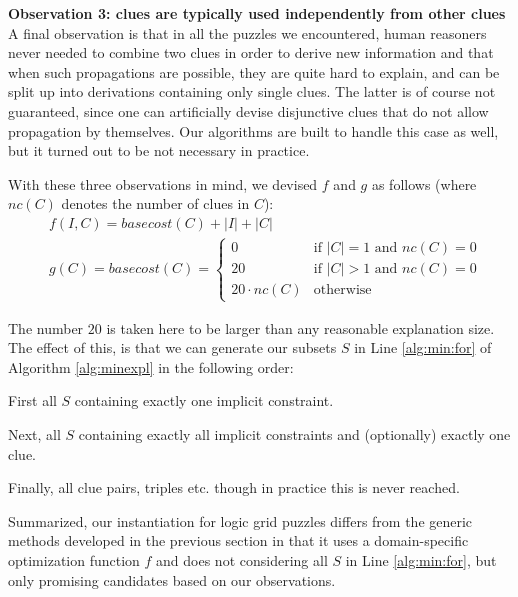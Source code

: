 \textbf{Observation 3: clues are typically used independently from other clues} 
A final observation is that in all the puzzles we encountered, human reasoners never needed to combine two clues in order to derive new information and that when such propagations are possible, they are quite hard to explain, and can be split up into derivations containing only single clues.
The latter is of course not guaranteed, since one can artificially devise disjunctive clues that do not allow propagation by themselves. 
Our algorithms are built to handle this case as well, but it turned out to be not necessary in practice. 

With these three observations in mind, we devised $f$ and $g$ as follows (where $nc(C)$ denotes the number of clues in $C$): \label{sec:cost}
\begin{align*}&f(I,C) = basecost(C) + |I| + |C|\\
&g(C) = basecost(C) = \left\{\begin{array}{ll}
                               0 & \text{if $|C|=1$ and $nc(C) = 0$}\\
                               20 & \text{if $|C|>1$ and $nc(C)=0$}\\
                               20\cdot nc(C) & \text{otherwise}
                              \end{array}\right.
                              \end{align*}
                              
The number $20$ is taken here to be larger than any reasonable explanation size. 
The effect of this,  is that we can generate our subsets $S$ in Line \ref{alg:min:for}
 of Algorithm \ref{alg:minexpl} in the following order:
\begin{compactitem}
 \item First all $S$ containing exactly one implicit constraint.
 \item Next, all $S$ containing exactly all implicit constraints and (optionally) exactly one clue.
 \item Finally, all clue pairs, triples etc. though in practice this is never reached.
\end{compactitem}
Summarized, our instantiation for logic grid puzzles differs from the generic methods developed in the previous section in that it uses a domain-specific optimization function $f$ and does not considering all $S$ in Line \ref{alg:min:for}, but only promising candidates based on our observations.

